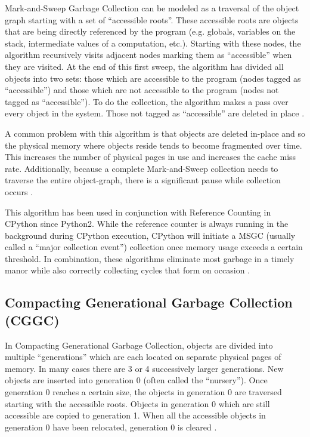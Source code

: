 \documentclass{article}
\begin{document}
Mark-and-Sweep Garbage Collection can be modeled as a traversal of the object graph starting with a set of ``accessible roots''.  These accessible roots are objects that are being directly referenced by the program (e.g. globals, variables on the stack, intermediate values of a computation, etc.).  Starting with these nodes, the algorithm recursively visits adjacent nodes marking them as ``accessible'' when they are visited.  At the end of this first sweep, the algorithm has divided all objects into two sets: those which are accessible to the program (nodes tagged as ``accessible'') and those which are not accessible to the program (nodes not tagged as ``accessible'').  To do the collection, the algorithm makes a pass over every object in the system.  Those not tagged as ``accessible'' are deleted in place \cite{GC-continuum}. 

A common problem with this algorithm is that objects are deleted in-place and so the physical memory where objects reside tends to become fragmented over time.  This increases the number of physical pages in use and increases the cache miss rate.  Additionally, because a complete Mark-and-Sweep collection needs to traverse the entire object-graph, there is a significant pause while collection occurs \cite{GC-continuum}.  

This algorithm has been used in conjunction with Reference Counting in CPython since Python2.  While the reference counter is always running in the background during CPython execution, CPython will initiate a MSGC (usually called a ``major collection event'') collection once memory usage exceeds a certain threshold.  In combination, these algorithms eliminate most garbage in a timely manor while also correctly collecting cycles that form on occasion \cite{cpython3-doc}.  

\subsection{Compacting Generational Garbage Collection (CGGC)}\label{sec:CGGC}

In Compacting Generational Garbage Collection, objects are divided into multiple ``generations'' which are each located on separate physical pages of memory.  In many cases there are 3 or 4 successively larger generations.  New objects are inserted into generation 0 (often called the ``nursery'').  Once generation 0 reaches a certain size, the objects in generation 0 are traversed starting with the accessible roots.  Objects in generation 0 which are still accessible are copied to generation 1.  When all the accessible objects in generation 0 have been relocated, generation 0 is cleared \cite{GC-continuum}.  
\end{document}
